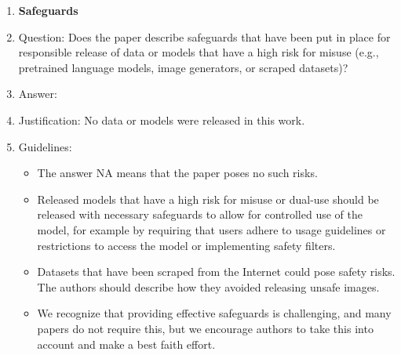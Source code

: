 \documentclass{article}
\theoremstyle{plain}
\theoremstyle{definition}
\begin{document}
\begin{enumerate}
\item {\bf Safeguards}
    \item[] Question: Does the paper describe safeguards that have been put in place for responsible release of data or models that have a high risk for misuse (e.g., pretrained language models, image generators, or scraped datasets)?
    \item[] Answer: \answerNA{} 
    \item[] Justification: No data or models were released in this work.
    \item[] Guidelines:
    \begin{itemize}
        \item The answer NA means that the paper poses no such risks.
        \item Released models that have a high risk for misuse or dual-use should be released with necessary safeguards to allow for controlled use of the model, for example by requiring that users adhere to usage guidelines or restrictions to access the model or implementing safety filters. 
        \item Datasets that have been scraped from the Internet could pose safety risks. The authors should describe how they avoided releasing unsafe images.
        \item We recognize that providing effective safeguards is challenging, and many papers do not require this, but we encourage authors to take this into account and make a best faith effort.
    \end{itemize}


\end{enumerate}
\end{document}
